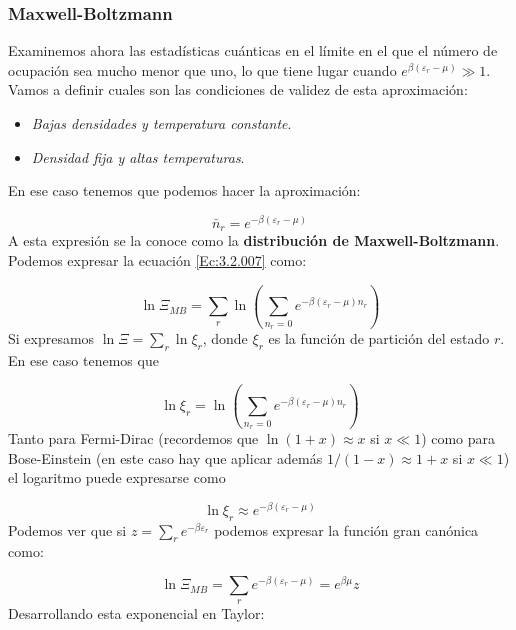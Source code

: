 \documentclass[12pt,a4paper]{article}
\numberwithin{equation}{section}
\numberwithin{figure}{section}
\newcommand{\parentesis}[1]{\left( #1  \right)}
\theoremstyle{definition}
\begin{document}
\subsubsection{Maxwell-Boltzmann}

Examinemos ahora las estadísticas cuánticas en el límite en el que el número de ocupación sea mucho menor que uno, lo que tiene lugar cuando $e^{\beta (\varepsilon_r - \mu)} \gg 1$. Vamos a definir cuales son las condiciones de validez de esta aproximación:

\begin{itemize}
\item \textit{Bajas densidades y temperatura constante}.
\item \textit{Densidad fija y altas temperaturas}. 
\end{itemize}
En ese caso tenemos que podemos hacer la aproximación:

\begin{equation}
\bar{n}_r = e^{-\beta (\varepsilon_r - \mu)}
\end{equation}
A esta expresión se la conoce como la \textbf{distribución de Maxwell-Boltzmann}. Podemos expresar la ecuación \ref{Ec:3.2.007} como:

\begin{equation}
\ln \Xi_{MB} = \sum_r \ln \parentesis{\sum_{n_r=0} e^{- \beta (\varepsilon_r - \mu) n_r} }
\end{equation}
Si expresamos $\ln \Xi = \sum_r \ln \xi_r$, donde $\xi_r$ es la función de partición del estado $r$. En ese caso tenemos que

\begin{equation}
\ln \xi_r = \ln  \parentesis{ \sum_{n_r=0} e^{- \beta (\varepsilon_r - \mu) n_r}}
\end{equation}
Tanto para Fermi-Dirac  (recordemos que $\ln (1+x) \approx x$ si $x\ll 1$) como para Bose-Einstein (en este caso hay que aplicar además $1/(1-x) \approx 1+x$  si $x\ll 1$) el logaritmo puede expresarse como

\begin{equation}
\ln \xi_r \approx e^{- \beta (\varepsilon_r - \mu)}
\end{equation}
Podemos ver que si $z=\sum_r e^{-\beta \varepsilon_r}$ podemos expresar la función gran canónica como:

\begin{equation}
\ln \Xi_{MB}  = \sum_r e^{-\beta(\varepsilon_r - \mu)} = e^{\beta \mu} z
\end{equation}
Desarrollando esta exponencial en Taylor: 
\end{document}
